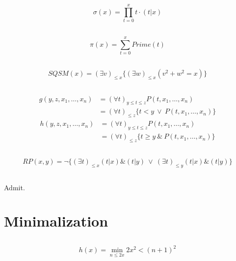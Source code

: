 \subsection{}
\[ \sigma(x) = \prod_{t=0}^{x}{t\cdot(t|x)} \]

\subsection{}
\[ \pi(x) = \sum_{t=0}^{x}{Prime(t)} \]

\subsection{}
\[ SQSM(x) = (\exists v)_{\le x}\{ (\exists w)_{\le x}(v^2+w^2=x) \} \]

\subsection{}
\[ \begin{array}{rl}
    g(y,z,x_{1},\dots ,x_{n})
  & = (\forall t)_{y\le t\le z}P(t,x_{1},\dots,x_{n}) \\
  & = (\forall t)_{\le z}\{ t<y \ \lor\ P(t,x_{1},\dots,x_{n}) \}
\end{array}\] \[ \begin{array}{rl}
    h(y,z,x_{1},\dots ,x_{n})
  & = (\forall t)_{y\le t\le z}P(t,x_{1},\dots,x_{n}) \\
  & = (\forall t)_{\le z}\{ t\ge y \ \&\ P(t,x_{1},\dots,x_{n}) \}
\end{array}\]

\subsection{}
\[ RP(x,y) = \neg\{ (\exists t)_{\le x}(t|x)\&(t|y) \ \lor\
                    (\exists t)_{\le y}(t|x)\&(t|y)  \} \]

\subsection{}
Admit.



\section{Minimalization}

\subsection{}
\[ h(x) = \min_{n\le 2x}{2x^2<(n+1)^2} \]

